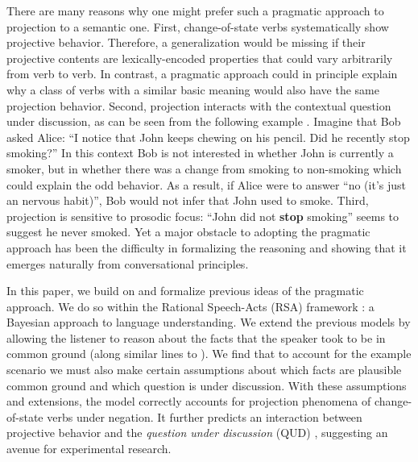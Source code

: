 \documentclass[10pt,letterpaper]{article}
\begin{document}
 
  There are many reasons why one might prefer such a pragmatic approach to projection to a 
 semantic one. 
First, change-of-state verbs systematically show projective behavior. 
Therefore, a generalization would be missing if their projective contents are
 lexically-encoded properties that could vary arbitrarily from verb to verb. In contrast, a pragmatic approach could in principle explain why a class of verbs with a similar basic meaning would also have the same projection behavior.
Second, projection interacts with the contextual question under discussion,
 as can be seen from the following example \cite{Geurts1995:Presupposing}.
Imagine that Bob asked Alice: ``I notice that John keeps chewing on his pencil. Did he recently stop smoking?''
In this context Bob is not interested in whether John is currently a smoker, but in whether there was a change from smoking to non-smoking which could explain the odd behavior. 
As a result, if Alice were to answer ``no (it's just an nervous habit)'', Bob would not infer that John used to smoke. 
Third, projection is sensitive to prosodic focus: ``John did not \textbf{stop} smoking'' seems to suggest he never smoked.
Yet a major obstacle to adopting the pragmatic approach has been the difficulty in formalizing the reasoning and showing that it emerges naturally from conversational principles.
 
In this paper, we build on and formalize previous ideas of the pragmatic approach.
We do so within the Rational Speech-Acts (RSA) framework  \cite{FrankGoodman2012:Predicting-Pragmatic-Reasoning-,GoodmanStuhlmuller2013:Knowledge-and-I}: a Bayesian 
approach to language understanding.
We extend the previous models by allowing the listener to reason about the facts that the speaker took to be in common ground (along similar lines to \cite{DegenEtAl2015-Cogsci}).
We find that to account for the example scenario we must also make certain assumptions about which facts are plausible common ground and which question is under discussion.
With these assumptions and extensions, the model correctly accounts for projection phenomena of change-of-state verbs under negation.
It further predicts an interaction between projective behavior and the  
 \emph{question under discussion} (QUD) \cite{Roberts2012:Information-Structure}, suggesting an avenue for experimental research.

\end{document}
